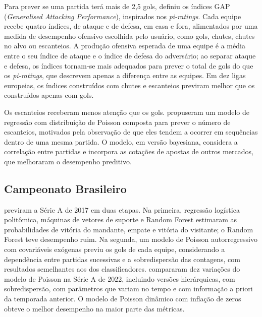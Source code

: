 Para prever se uma partida terá mais de 2,5 gols,  definiu os índices GAP (\textit{Generalised Attacking Performance}), inspirados nos \textit{pi-ratings}. Cada equipe recebe quatro índices, de ataque e de defesa, em casa e fora, alimentados por uma medida de desempenho ofensivo escolhida pelo usuário, como gols, chutes, chutes no alvo ou escanteios. A produção ofensiva esperada de uma equipe é a média entre o seu índice de ataque e o índice de defesa do adversário; ao separar ataque e defesa, os índices tornam-se mais adequados para prever o total de gols do que os \textit{pi-ratings}, que descrevem apenas a diferença entre as equipes. Em dez ligas europeias, os índices construídos com chutes e escanteios previram melhor que os construídos apenas com gols.

Os escanteios receberam menos atenção que os gols.  propuseram um modelo de regressão com distribuição de Poisson composta para prever o número de escanteios, motivados pela observação de que eles tendem a ocorrer em sequências dentro de uma mesma partida. O modelo, em versão bayesiana, considera a correlação entre partidas e incorpora as cotações de apostas de outros mercados, que melhoraram o desempenho preditivo.

\subsection{Campeonato Brasileiro}\label{subsec:RelBrasileiro}

 previram a Série A de 2017 em duas etapas. Na primeira, regressão logística politômica, máquinas de vetores de suporte e Random Forest estimaram as probabilidades de vitória do mandante, empate e vitória do visitante; o Random Forest teve desempenho ruim. Na segunda, um modelo de Poisson autorregressivo com covariáveis exógenas previu os gols de cada equipe, considerando a dependência entre partidas sucessivas e a sobredispersão das contagens, com resultados semelhantes aos dos classificadores.  compararam dez variações do modelo de Poisson na Série A de 2022, incluindo versões hierárquicas, com sobredispersão, com parâmetros que variam no tempo e com informação a priori da temporada anterior. O modelo de Poisson dinâmico com inflação de zeros obteve o melhor desempenho na maior parte das métricas.

